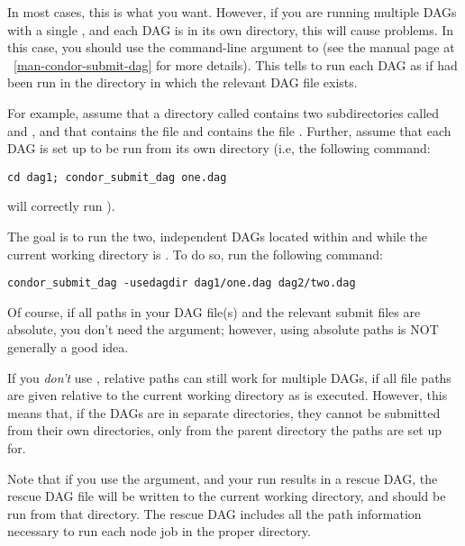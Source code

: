 In most cases, this is what you want.  However, if you are running
multiple DAGs with a single , and each DAG is in its
own directory, this will cause problems.  In this case, you
should use the  command-line argument to
 (see the  manual page at
~\ref{man-condor-submit-dag} for more details).
This tells  to run each DAG
as if  had been run in the directory in which
the relevant DAG file exists.

For example, assume that a directory called 
contains two subdirectories called  and
, and that  contains the file 
and  contains the file .
Further, assume that each DAG is set up to be run
from its own directory (i.e, the following command:
\begin{verbatim}
cd dag1; condor_submit_dag one.dag
\end{verbatim}
will correctly run ).

The goal is to run the two, independent DAGs located within
 and  while the current working directory
is .  To do so, run the following command:
\begin{verbatim}
condor_submit_dag -usedagdir dag1/one.dag dag2/two.dag
\end{verbatim}

Of course, if all paths in your DAG file(s) and the relevant submit
files are absolute, you don't need the  argument;
however, using absolute paths is NOT generally a good idea.

If you \emph{don't} use , relative paths can still work
for multiple DAGs, if
all file paths are given relative to
the current working directory as  is executed.
However, this means that, if the DAGs are in separate directories, they
cannot be submitted from their own directories, only from the parent
directory the paths are set up for.

Note that if you use the  argument, and your run
results in a rescue DAG, the rescue DAG file will be written to
the current working directory, and should be run from that directory.
The rescue DAG includes all the path information necessary to
run each node job in the proper directory.

